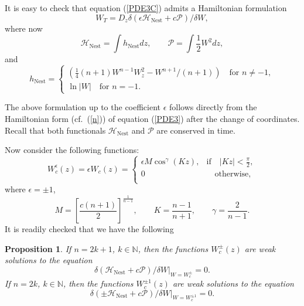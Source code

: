 \documentclass[12pt]{article}
\newtheorem{pro}{Proposition}
\begin{document}
It is easy to check that
equation (\ref{PDE3C})
admits a Hamiltonian formulation
\begin{equation}\label{Hamrepr2}
W_T = D_z
{\delta \left( \epsilon \mathcal{H}_{\mathrm{Nest}} +c \mathcal{P}\right)}/{\delta W},
\end{equation}
where now
\[
 \mathcal{H}_{\mathrm{Nest}}=\int  h_{\mathrm{Nest}} dz,\qquad \mathcal{P}=\int \frac{1}{2} W^2 dz,
\]
and
\[
h_{\mathrm{Nest}}=\left\{\begin{array}{l}\displaystyle\left(\frac14 (n+1)W^{n-1}W_z^2-W^{n+1}/(n+1)\right)\quad\mbox{for $n\neq-1$},\\[5mm] \displaystyle\ln |W|\quad\mbox{for $n=-1$.}\end{array}\right.
\]

The above formulation up to the coefficient $\epsilon$ follows directly
from the Hamiltonian form (cf.\ (\ref{n}))  of equation (\ref{PDE3}) after the change of coordinates.
Recall that both functionals $\mathcal{H}_{\mathrm{Nest}}$ and $\mathcal{P}$ are conserved in time.

Now consider the following functions:
\begin{equation}\label{comp2a}
W_c^\epsilon(z)=\epsilon W_c(z)=\begin{cases}\epsilon  M \cos^{\gamma} \left(K z\right), & \mathrm{if}\quad |K z|<\frac{\pi}{2}, \\
0 & \quad \mathrm{otherwise},\\
\end{cases}
\end{equation}
where $\epsilon = \pm 1$,
\[
 M=\left[\frac{c (n+1)}{2}  \right]^{\frac{1}{n-1}}, \qquad K=\frac{n-1}{n+1},  \qquad \gamma=\frac{2}{n-1}.
\]
It is readily checked that we have the following
\begin{pro}\label{gs}
If $n=2 k+1$, $k \in \mathbb{N}$, then the functions $W_c^\pm(z)$ are weak solutions to the equation
\begin{equation}\label{variat2D}
\delta \left(\mathcal{H}_{\mathrm{Nest}} +c \mathcal{P}\right)/\delta W|_{W=W_c^\pm} =0.
\end{equation}
If $n=2 k$, $k \in \mathbb{N}$, then the functions $W_c^{\pm 1}(z)$ are weak solutions to the equation
\begin{equation}\label{variateps}
\delta \left( \pm \mathcal{H}_{\mathrm{Nest}} +c \mathcal{P}\right)/\delta W|_{W=W_c^{\pm 1}} =0.
\end{equation}
\end{pro}
\end{document}
